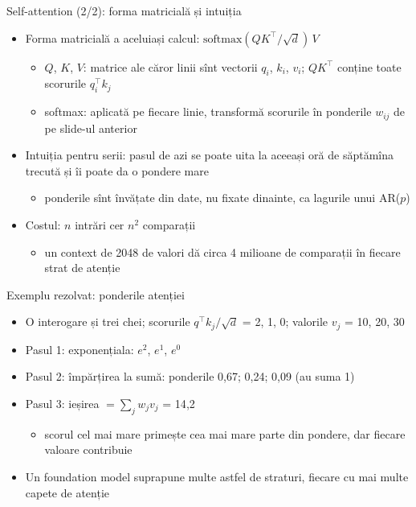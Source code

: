 \begin{frame}{Self-attention (2/2): forma matricială și intuiția}
\itemsize{\small}
\begin{itemize}
    \item Forma matricială a aceluiași calcul: $\text{softmax}(QK^\top/\sqrt{d})\,V$
    \begin{itemize}
        \item $Q$, $K$, $V$: matrice ale căror linii sînt vectorii $q_i$, $k_i$, $v_i$; $QK^\top$ conține toate scorurile $q_i^\top k_j$
        \item softmax: aplicată pe fiecare linie, transformă scorurile în ponderile $w_{ij}$ de pe slide-ul anterior
    \end{itemize}
    \item Intuiția pentru serii: pasul de azi se poate uita la aceeași oră de săptămîna trecută și îi poate da o pondere mare
    \begin{itemize}
        \item ponderile sînt învățate din date, nu fixate dinainte, ca lagurile unui AR($p$)
    \end{itemize}
    \item Costul: $n$ intrări cer $n^2$ comparații
    \begin{itemize}
        \item un context de 2048 de valori dă circa 4 milioane de comparații în fiecare strat de atenție
    \end{itemize}
\end{itemize}
\end{frame}

\begin{frame}{Exemplu rezolvat: ponderile atenției}
\itemsize{\small}
\begin{itemize}
    \item O interogare și trei chei; scorurile $q^\top k_j/\sqrt{d}$ = 2, 1, 0; valorile $v_j$ = 10, 20, 30
    \item Pasul 1: exponențiala: $e^2$, $e^1$, $e^0$
    \item Pasul 2: împărțirea la sumă: ponderile 0{,}67; 0{,}24; 0{,}09 (au suma 1)
    \item Pasul 3: ieșirea $= \sum_j w_j v_j$ = 14{,}2
    \begin{itemize}
        \item scorul cel mai mare primește cea mai mare parte din pondere, dar fiecare valoare contribuie
    \end{itemize}
    \item Un foundation model suprapune multe astfel de straturi, fiecare cu mai multe capete de atenție
\end{itemize}
\end{frame}


